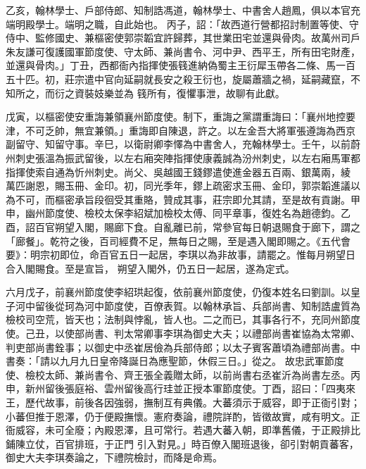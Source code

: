 \begin{pinyinscope}
乙亥，翰林學士、戶部侍郎、知制誥馮道，翰林學士、中書舍人趙鳳，俱以本官充端明殿學士。端明之職，自此始也。
 丙子，詔：「故西道行營都招討制置等使、守侍中、監修國史、兼樞密使郭崇韜宜許歸葬，其世業田宅並還與骨肉。故萬州司戶朱友謙可復護國軍節度使、守太師、兼尚書令、河中尹、西平王，所有田宅財產，並還與骨肉。」丁丑，西都衙內指揮使張篯進納偽蜀主王衍犀玉帶各二條、馬一百五十匹。初，莊宗遣中官向延嗣就長安之殺王衍也，旋屬蕭牆之禍，延嗣藏竄，不知所之，而衍之資裝妓樂並為
 篯所有，復懼事泄，故聊有此獻。



 戊寅，以樞密使安重誨兼領襄州節度使。制下，重誨之黨謂重誨曰：「襄州地控要津，不可乏帥，無宜兼領。」重誨即自陳退，許之。以左金吾大將軍張遵誨為西京副留守、知留守事。辛巳，以衛尉卿李懌為中書舍人，充翰林學士。壬午，以前蔚州刺史張溫為振武留後，以左右廂突陣指揮使康義誠為汾州刺史，以左右廂馬軍都指揮使索自通為忻州刺史。尚父、吳越國王錢鏐遣使進金器五百兩、銀萬兩，綾
 萬匹謝恩，賜玉冊、金印。初，同光季年，鏐上疏密求玉冊、金印，郭崇韜進議以為不可，而樞密承旨段徊受其重賂，贊成其事，莊宗即允其請，至是故有貢謝。甲申，幽州節度使、檢校太保李紹斌加檢校太傅、同平章事，復姓名為趙德鈞。乙酉，詔百官朔望入閣，賜廊下食。自亂離已前，常參官每日朝退賜食于廊下，謂之「廊餐」。乾符之後，百司經費不足，無每日之賜，至是遇入閣即賜之。《五代會要》：明宗初即位，命百官五日一起居，李琪以為非故事，請罷之。惟每月朔望日合入閣賜食。至是宣旨，
 朔望入閣外，仍五日一起居，遂為定式。



 六月戊子，前襄州節度使李紹珙起復，依前襄州節度使，仍復本姓名曰劉訓。以皇子河中留後從珂為河中節度使，百僚表賀。以翰林承旨、兵部尚書、知制誥盧質為檢校司空荒，皆天也；法制與悖亂，皆人也。二之而已，其事各行不，充同州節度使。己丑，以使部尚書、判太常卿事李琪為御史大夫；以禮部尚書崔協為太常卿、判吏部尚書銓事；以御史中丞崔居儉為兵部侍郎；以太子賓客蕭頃為禮部尚書。中書奏：「請以九月九日皇帝降誕日為應聖節，休假三日。」從之。
 故忠武軍節度使、檢校太師、兼尚書令、齊王張全義贈太師，以前尚書右丞崔沂為尚書左丞。丙申，新州留後張庭裕、雲州留後高行珪並正授本軍節度使。丁酉，詔曰：「四夷來王，歷代故事，前後各因強弱，撫制互有典儀。大蕃須示于威容，即于正衙引對；小蕃但推于恩澤，仍于便殿撫懷。憲府奏論，禮院詳酌，皆徵故實，咸有明文。正衙威容，未可全廢；內殿恩澤，且可常行。若遇大蕃入朝，即準舊儀，于正殿排比鋪陳立仗，百官排班，于正門
 引入對見。」時百僚入閣班退後，卻引對朝貢蕃客，御史大夫李琪奏論之，下禮院檢討，而降是命焉。




\end{pinyinscope}
